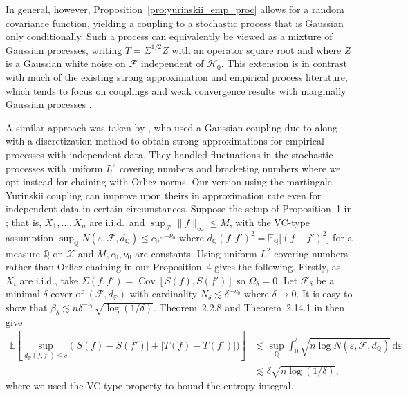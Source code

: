 \documentclass[11pt,lof]{puthesis}
\renewcommand{\P}{\ensuremath{\mathbb{P}}}
\newcommand{\E}{\ensuremath{\mathbb{E}}}
\newcommand{\Q}{\ensuremath{\mathbb{Q}}}
\newcommand{\cH}{\ensuremath{\mathcal{H}}}
\newcommand{\cF}{\ensuremath{\mathcal{F}}}
\newcommand{\cX}{\ensuremath{\mathcal{X}}}
\DeclareMathOperator{\Cov}{Cov}
\newcommand{\diff}[1]{\,\mathrm{d}#1}
\theoremstyle{break}
\theoremstyle{proof}
\begin{document}
In general, however, Proposition~\ref{pro:yurinskii_emp_proc} allows for a
random covariance function, yielding a coupling to a stochastic process that is
Gaussian only conditionally. Such a process can equivalently be viewed as a
mixture of Gaussian processes, writing $T=\Sigma^{1/2} Z$ with an operator
square root and where $Z$ is a Gaussian white noise on $\cF$ independent of
$\cH_0$. This extension is in contrast with much of the existing strong
approximation and empirical process literature, which tends to focus on
couplings and weak convergence results with marginally Gaussian processes
\citep{settati2009gaussian,chernozhukov2016empirical}.

A similar approach was taken by \citet{berthet2006revisiting}, who used a
Gaussian coupling due to \citet{zaitsev1987estimates,zaitsev1987gaussian} along
with a discretization method to obtain strong approximations for empirical
processes with independent data. They handled fluctuations in the stochastic
processes with uniform $L^2$ covering numbers and bracketing numbers where we
opt instead for chaining with Orlicz norms. Our version using the martingale
Yurinskii coupling can improve upon theirs in approximation rate even for
independent data in certain circumstances. Suppose the setup of
Proposition~1 in \citet{berthet2006revisiting}; that is, $X_1, \ldots, X_n$ are
i.i.d.\ and $\sup_{\cF} \|f\|_\infty \leq M$, with the VC-type assumption
$\sup_\Q N(\varepsilon, \cF, d_\Q) \leq c_0 \varepsilon^{-\nu_0}$ where
$d_\Q(f,f')^2 = \E_\Q\big[(f-f')^2\big]$ for a measure $\Q$ on $\cX$ and
$M, c_0, \nu_0$ are constants. Using uniform $L^2$ covering numbers
rather than Orlicz chaining in our Proposition~4 gives the following.
Firstly, as $X_i$ are i.i.d., take $\Sigma(f, f') = \Cov[S(f), S(f')]$ so
$\Omega_\delta = 0$. Let $\cF_\delta$ be a minimal $\delta$-cover of
$(\cF, d_\P)$ with cardinality $N_\delta \lesssim \delta^{-\nu_0}$ where
$\delta \to 0$. It is easy to show that
$\beta_\delta \lesssim n \delta^{-\nu_0} \sqrt{\log(1/\delta)}$.
Theorem~2.2.8 and Theorem~2.14.1 in \citet{van1996weak} then give
%
\begin{align*}
  \E\left[
    \sup_{d_\P(f,f') \leq \delta}
    \Big(
      |S(f) - S(f')|
      + |T(f) - T(f')|
    \Big)
  \right]
  &\lesssim
  \sup_\Q
  \int_0^\delta
  \sqrt{n \log N(\varepsilon, \cF, d_\Q)}
  \diff{\varepsilon} \\
  &\lesssim
  \delta \sqrt{n\log(1/\delta)},
\end{align*}
%
where we used the VC-type property to bound the entropy integral.
\end{document}
